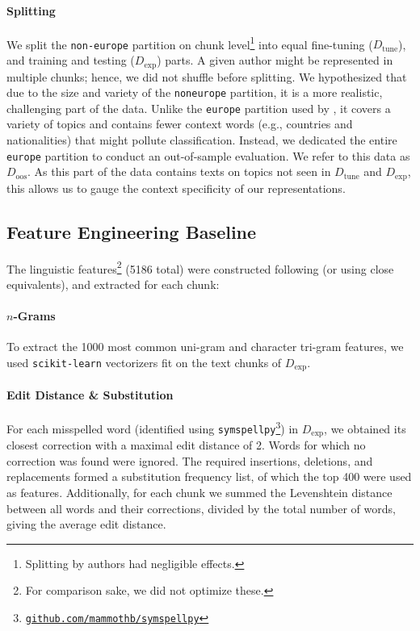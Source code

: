 \documentclass[10pt, a4paper]{article}
\begin{document}
\paragraph{Splitting} \label{sec:data-splitting} We split the \texttt{non-europe} partition on chunk level\footnote{Splitting by authors had negligible effects.} into equal fine-tuning ($D_\text{tune}$), and training and testing ($D_\text{exp}$) parts. A given author might be represented in multiple chunks; hence, we did not shuffle before splitting. We hypothesized that due to the size and variety of the \texttt{non\textunderscore europe} partition, it is a more realistic, challenging part of the data. Unlike the \texttt{europe} partition used by , it covers a variety of topics and contains fewer context words (e.g., countries and nationalities) that might pollute classification. Instead, we dedicated the entire \texttt{europe} partition to conduct an out-of-sample evaluation. We refer to this data as $D_\text{oos}$. As this part of the data contains texts on topics not seen in $D_\text{tune}$ and $D_\text{exp}$, this allows us to gauge the context specificity of our representations.


\subsection{Feature Engineering Baseline} \label{sec:feature-engineering}

The linguistic features\footnote{For comparison sake, we did not optimize these.} (5186 total) were constructed following  (or using close equivalents), and extracted for each chunk:

\paragraph{$n$-Grams} To extract the 1000 most common uni-gram and character tri-gram features, we used \texttt{scikit-learn} \cite{DBLP:journals/jmlr/PedregosaVGMTGBPWDVPCBPD11} vectorizers fit on the text chunks of $D_\text{exp}$.

\paragraph{Edit Distance \& Substitution} For each misspelled word (identified using \texttt{symspellpy}\footnote{\href{https://github.com/mammothb/symspellpy}{\texttt{github.com/mammothb/symspellpy}}}) in $D_\text{exp}$, we obtained its closest correction with a maximal edit distance of 2. Words for which no correction was found were ignored. The required insertions, deletions, and replacements formed a substitution frequency list, of which the top 400 were used as features. Additionally, for each chunk we summed the Levenshtein distance between all words and their corrections, divided by the total number of words, giving the average edit distance.
\end{document}
